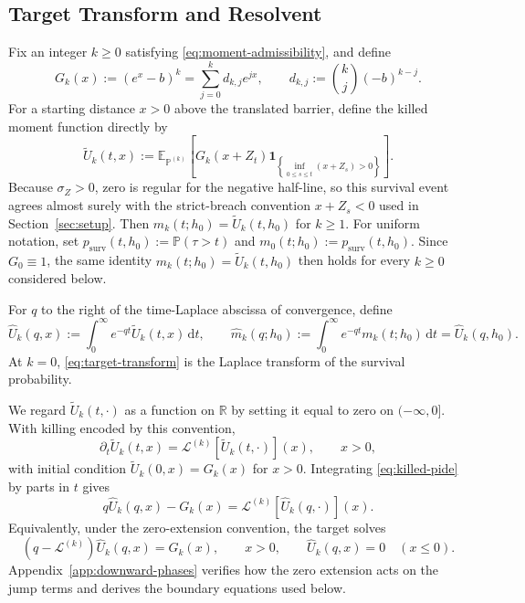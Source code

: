 \documentclass[11pt]{article}
\newcommand{\E}{\mathbb{E}}
\renewcommand{\P}{\mathbb{P}}
\newcommand{\R}{\mathbb{R}}
\newcommand{\diff}{\mathrm{d}}
\newcommand{\one}{\mathbf{1}}
\theoremstyle{plain}
\theoremstyle{definition}
\theoremstyle{remark}
\begin{document}
\subsection{Target Transform and Resolvent}

Fix an integer $k\ge0$ satisfying \eqref{eq:moment-admissibility}, and
define
\begin{equation}\label{eq:forcing-expansion}
G_k(x):=(e^x-b)^k
=\sum_{j=0}^k d_{k,j}e^{jx},
\qquad
d_{k,j}:=\binom{k}{j}(-b)^{k-j}.
\end{equation}
For a starting distance $x>0$ above the translated barrier, define the killed moment function
directly by
\[
\widetilde U_k(t,x)
:=\E_{\P^{(k)}}\!\left[
G_k(x+Z_t)
\one_{\left\{\inf_{0\le s\le t}(x+Z_s)>0\right\}}
\right].
\]
Because $\sigma_Z>0$, zero is regular for the negative half-line, so this survival event
agrees almost surely with the strict-breach convention $x+Z_s<0$ used in
Section~\ref{sec:setup}. Then $m_k(t;h_0)=\widetilde U_k(t,h_0)$ for $k\ge1$. For uniform
notation, set $p_{\mathrm{surv}}(t,h_0):=\P(\tau>t)$ and
$m_0(t;h_0):=p_{\mathrm{surv}}(t,h_0)$. Since $G_0\equiv1$, the same identity
$m_k(t;h_0)=\widetilde U_k(t,h_0)$ then holds for every $k\ge0$ considered below.

For $q$ to the right of the time-Laplace abscissa of convergence, define
\begin{equation}\label{eq:target-transform}
\widehat U_k(q,x):=\int_0^\infty e^{-qt}\widetilde U_k(t,x)\,\diff t,
\qquad
\widehat m_k(q;h_0)
:=\int_0^\infty e^{-qt}m_k(t;h_0)\,\diff t
=\widehat U_k(q,h_0).
\end{equation}
At $k=0$, \eqref{eq:target-transform} is the Laplace transform of the survival probability.

We regard $\widetilde U_k(t,\cdot)$ as a function on $\R$ by setting it equal to
zero on $(-\infty,0]$. With killing encoded by this convention,
\begin{equation}\label{eq:killed-pide}
\partial_t\widetilde U_k(t,x)
=\mathcal L^{(k)}\!\left[\widetilde U_k(t,\cdot)\right](x),
\qquad x>0,
\end{equation}
with initial condition $\widetilde U_k(0,x)=G_k(x)$ for $x>0$. Integrating
\eqref{eq:killed-pide} by parts in $t$
gives
\[
q\widehat U_k(q,x)-G_k(x)
=\mathcal L^{(k)}\!\left[\widehat U_k(q,\cdot)\right](x).
\]
Equivalently, under the zero-extension convention, the target solves
\begin{equation}\label{eq:resolvent}
(q-\mathcal L^{(k)})\widehat U_k(q,x)=G_k(x),
\qquad x>0,
\qquad
\widehat U_k(q,x)=0\quad(x\le0).
\end{equation}
Appendix~\ref{app:downward-phases} verifies how the zero extension acts on the jump terms and
derives the boundary equations used below.
\end{document}
